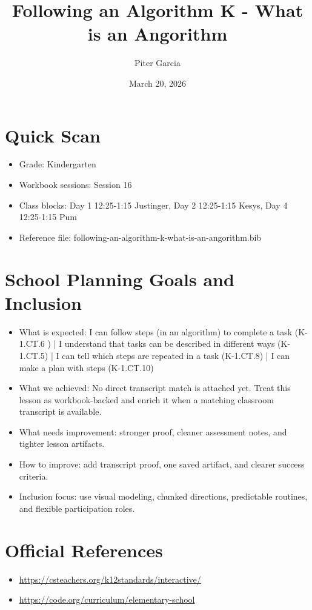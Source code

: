 \documentclass[11pt]{article}
\title{Following an Algorithm K - What is an Angorithm}
\author{Piter Garcia}
\date{March 20, 2026}
\begin{document}
    \maketitle
    \section*{Quick Scan}
    \begin{itemize}[leftmargin=*]
    \item Grade: Kindergarten
    \item Workbook sessions: Session 16
    \item Class blocks: Day 1 12:25-1:15 Justinger, Day 2 12:25-1:15 Kesys, Day 4 12:25-1:15 Pum
    \item Reference file: following-an-algorithm-k-what-is-an-angorithm.bib
    \end{itemize}
    \section*{School Planning Goals and Inclusion}
    \begin{itemize}[leftmargin=*]
    \item What is expected: I can follow steps (in an algorithm) to complete a task (K-1.CT.6 ) | I understand that tasks can be described in different ways (K-1.CT.5) | I can tell which steps are repeated in a task (K-1.CT.8) | I can make a plan with steps (K-1.CT.10)
    \item What we achieved: No direct transcript match is attached yet. Treat this lesson as workbook-backed and enrich it when a matching classroom transcript is available.
    \item What needs improvement: stronger proof, cleaner assessment notes, and tighter lesson artifacts.
    \item How to improve: add transcript proof, one saved artifact, and clearer success criteria.
    \item Inclusion focus: use visual modeling, chunked directions, predictable routines, and flexible participation roles.
    \end{itemize}
    \section*{Official References}
    \begin{itemize}[leftmargin=*]
    \item \url{https://csteachers.org/k12standards/interactive/}
\item \url{https://code.org/curriculum/elementary-school}

    \end{itemize}
    
\end{document}
